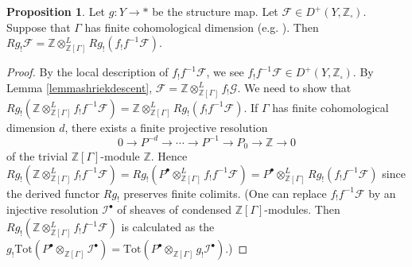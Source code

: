 \documentclass{article}
\theoremstyle{definition}
\newtheorem{proposition}[theorem]{Proposition}
\def\sF{{\mathscr{F}}}
\def\sG{{\mathscr{G}}}
\def\sI{{\mathscr{I}}}
\def\bbZ{\mathbb{Z}}
\begin{document}
\begin{proposition}\label{prop:Gammaequivariantpushforward}
	Let $g:Y\rightarrow *$ be the structure map. Let $\sF\in D^+(Y,\bbZ_{\square})$. Suppose that $\Gamma$ has finite cohomological dimension (e.g. \cite[\S 6.1]{borel1976cohomologie}). Then $Rg_!\sF=\bbZ\otimes^L_{\bbZ[\Gamma]}Rg_!(f_!f^{-1}\sF).$
\end{proposition}
\begin{proof}
	By the local description of $f_!f^{-1}\sF$, we see $f_!f^{-1}\sF\in D^+(Y,\bbZ_{\square})$. By Lemma \ref{lemmashriekdescent}, $\sF=\bbZ\otimes^L_{\bbZ[\Gamma]}f_!\sG$. We need to show that $Rg_!(\bbZ\otimes^L_{\bbZ[\Gamma]}f_!f^{-1}\sF)=\bbZ\otimes^L_{\bbZ[\Gamma]}Rg_!(f_!f^{-1}\sF)$. If $\Gamma$ has finite cohomological dimension $d$, there exists a finite projective resolution 
	\[0\rightarrow P^{-d}\rightarrow\cdots\rightarrow P^{-1}\rightarrow P_0\rightarrow \bbZ\rightarrow 0\]
	of the trivial $\bbZ[\Gamma]$-module $\bbZ$. Hence $Rg_!(\bbZ\otimes^L_{\bbZ[\Gamma]}f_!f^{-1}\sF)=Rg_!(P^{\bullet}\otimes^L_{\bbZ[\Gamma]}f_!f^{-1}\sF)=P^{\bullet}\otimes^L_{\bbZ[\Gamma]}Rg_!(f_!f^{-1}\sF)$ since the derived functor $Rg_!$ preserves finite colimits. (One can replace $f_!f^{-1}\sF$ by an injective resolution $\sI^{\bullet}$ of sheaves of condensed $\bbZ[\Gamma]$-modules. Then $Rg_!(\bbZ\otimes^L_{\bbZ[\Gamma]}f_!f^{-1}\sF)$ is calculated as the $g_!\mathrm{Tot}(P^{\bullet}\otimes_{\bbZ[\Gamma]}\sI^{\bullet})=\mathrm{Tot}(P^{\bullet}\otimes_{\bbZ[\Gamma]}g_!\sI^{\bullet})$.)
\end{proof}
%


\end{document}
